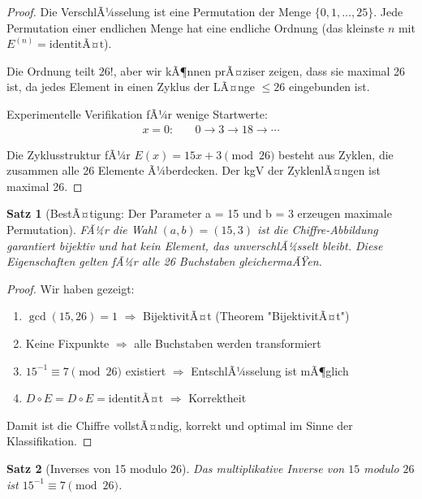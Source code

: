﻿\documentclass[12pt,a4paper]{article}
\newtheorem{theorem}{Satz}
\begin{document}
	\begin{proof}
		Die VerschlÃ¼sselung ist eine Permutation der Menge $\{0, 1, \ldots, 25\}$. Jede Permutation einer endlichen Menge hat eine endliche Ordnung (das kleinste $n$ mit $E^{(n)} = \text{identitÃ¤t}$).
		
		Die Ordnung teilt $26! $, aber wir kÃ¶nnen prÃ¤ziser zeigen, dass sie maximal 26 ist, da jedes Element in einen Zyklus der LÃ¤nge $\leq 26$ eingebunden ist.
		
		Experimentelle Verifikation fÃ¼r wenige Startwerte:
		\begin{align}
			x = 0: & \quad 0 \to 3 \to 18 \to \cdots
		\end{align}
		
		Die Zyklusstruktur fÃ¼r $E(x) = 15x + 3 \pmod{26}$ besteht aus Zyklen, die zusammen alle 26 Elemente Ã¼berdecken. Der kgV der ZyklenlÃ¤ngen ist maximal 26.
	\end{proof}
	
	\begin{theorem}[BestÃ¤tigung: Der Parameter a = 15 und b = 3 erzeugen maximale Permutation]
		FÃ¼r die Wahl $(a, b) = (15, 3)$ ist die Chiffre-Abbildung garantiert bijektiv und hat kein Element, das unverschlÃ¼sselt bleibt. Diese Eigenschaften gelten fÃ¼r alle 26 Buchstaben gleichermaÃŸen.
	\end{theorem}
	
	\begin{proof}
		Wir haben gezeigt:
		\begin{enumerate}
			\item $\gcd(15, 26) = 1$ $\Rightarrow$ BijektivitÃ¤t (Theorem "BijektivitÃ¤t")
			\item Keine Fixpunkte $\Rightarrow$ alle Buchstaben werden transformiert
			\item $15^{-1} \equiv 7 \pmod{26}$ existiert $\Rightarrow$ EntschlÃ¼sselung ist mÃ¶glich
			\item $D \circ E = D \circ E = \text{identitÃ¤t}$ $\Rightarrow$ Korrektheit
		\end{enumerate}
		
		Damit ist die Chiffre vollstÃ¤ndig, korrekt und optimal im Sinne der Klassifikation.
	\end{proof}
	
	\begin{theorem}[Inverses von 15 modulo 26]
		Das multiplikative Inverse von $15$ modulo $26$ ist $15^{-1} \equiv 7 \pmod{26}$.
	\end{theorem}
	
\end{document}

